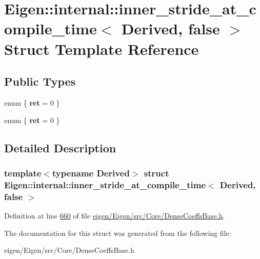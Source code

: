\hypertarget{struct_eigen_1_1internal_1_1inner__stride__at__compile__time_3_01_derived_00_01false_01_4}{}\section{Eigen\+:\+:internal\+:\+:inner\+\_\+stride\+\_\+at\+\_\+compile\+\_\+time$<$ Derived, false $>$ Struct Template Reference}
\label{struct_eigen_1_1internal_1_1inner__stride__at__compile__time_3_01_derived_00_01false_01_4}
\subsection*{Public Types}
\begin{DoxyCompactItemize}
\item 
\mbox{\label{struct_eigen_1_1internal_1_1inner__stride__at__compile__time_3_01_derived_00_01false_01_4_a479de0c3e0eeba4f59ed5493c33a552f}} 
enum \{ {\bfseries ret} = 0
 \}
\item 
\mbox{\label{struct_eigen_1_1internal_1_1inner__stride__at__compile__time_3_01_derived_00_01false_01_4_adfa380aec4362b6d754cb1c2a019ee9d}} 
enum \{ {\bfseries ret} = 0
 \}
\end{DoxyCompactItemize}


\subsection{Detailed Description}
\subsubsection*{template$<$typename Derived$>$\newline
struct Eigen\+::internal\+::inner\+\_\+stride\+\_\+at\+\_\+compile\+\_\+time$<$ Derived, false $>$}



Definition at line \hyperlink{eigen_2_eigen_2src_2_core_2_dense_coeffs_base_8h_source_l00660}{660} of file \hyperlink{eigen_2_eigen_2src_2_core_2_dense_coeffs_base_8h_source}{eigen/\+Eigen/src/\+Core/\+Dense\+Coeffs\+Base.\+h}.



The documentation for this struct was generated from the following file\+:\begin{DoxyCompactItemize}
\item 
eigen/\+Eigen/src/\+Core/\+Dense\+Coeffs\+Base.\+h\end{DoxyCompactItemize}
